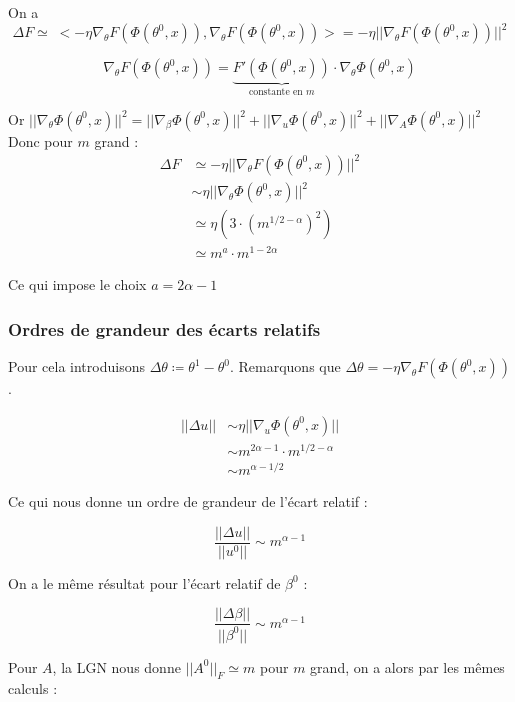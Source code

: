 \documentclass[a4paper, 11pt, french]{article}
\theoremstyle{definition}
\begin{document}
	 On a 
	 \[
	 \Delta F \simeq \; < -\eta \nabla_{\theta} F(\Phi(\theta^0, x)) , \nabla_{\theta} F(\Phi(\theta^0, x)) > = -\eta || \nabla_{\theta} F(\Phi(\theta^0, x)) ||^2
	 \]
	 
	 \[
	 \nabla_{\theta} F(\Phi(\theta^0, x)) = 
	 \underbrace{F'(\Phi(\theta^0, x))}_\text{constante en $m$} 
	 \cdot \nabla_{\theta} \Phi(\theta^0, x)
	 \]
	 
	 Or $ || \nabla_{\theta} \Phi(\theta^0, x) ||^2 = || \nabla_{\beta} \Phi(\theta^0, x) ||^2 + || \nabla_{u} \Phi(\theta^0, x) ||^2 + || \nabla_{A} \Phi(\theta^0, x) ||^2$ \\
	 
	 Donc pour $m$ grand :
	 \begin{align*}
	 	\Delta F &\simeq -\eta || \nabla_{\theta} F(\Phi(\theta^0, x)) ||^2 \\
	 	&\sim \eta || \nabla_{\theta} \Phi(\theta^0, x) ||^2 \\
	 	&\simeq \eta (3 \cdot (m^{1/2 - \alpha})^2) \\
	 	&\simeq m^a \cdot m^{1 - 2\alpha}
	 \end{align*}	
	
	Ce qui impose le choix $a = 2\alpha - 1$ \\
	
	\subsubsection{Ordres de grandeur des écarts relatifs}

	Pour cela introduisons $\Delta \theta \coloneqq \theta^1 - \theta^0$. Remarquons que $	\Delta \theta = - \eta \nabla_{\theta} F(\Phi(\theta^0, x))$.
	
	\begin{align}
		||\Delta u|| &\sim \eta || \nabla_u \Phi(\theta^0, x) || \\
		&\sim m^{2\alpha - 1} \cdot m^{1/2 - \alpha} \\
		&\sim m^{\alpha - 1/2}
	\end{align}

	Ce qui nous donne un ordre de grandeur de l'écart relatif :
	
	\[\frac{||\Delta u||}{||u^0||} \sim m^{\alpha - 1}\]
	
	On a le même résultat pour l'écart relatif de $\beta^0$ :
	
	\[\frac{||\Delta \beta||}{||\beta^0||} \sim m^{\alpha - 1}\]
	
	Pour $A$, la LGN nous donne $||A^0||_F \simeq m$ pour $m$ grand, on a alors par les mêmes calculs :
	
\end{document}
